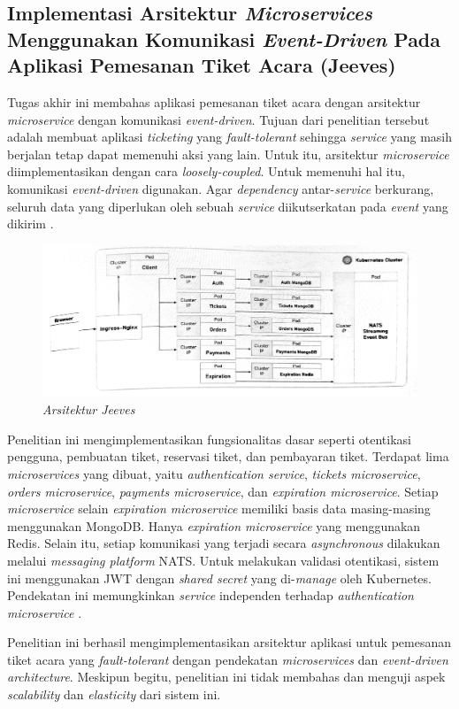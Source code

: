 \subsection{Implementasi Arsitektur \textit{Microservices} Menggunakan Komunikasi \textit{Event-Driven} Pada Aplikasi Pemesanan Tiket Acara (Jeeves)}

Tugas akhir ini membahas aplikasi pemesanan tiket acara dengan arsitektur \textit{microservice} dengan komunikasi \textit{event-driven}. Tujuan dari penelitian tersebut adalah membuat aplikasi \textit{ticketing} yang \textit{fault-tolerant} sehingga \textit{service} yang masih berjalan tetap dapat memenuhi aksi yang lain. Untuk itu, arsitektur \textit{microservice} diimplementasikan dengan cara \textit{loosely-coupled}. Untuk memenuhi hal itu, komunikasi \textit{event-driven} digunakan. Agar \textit{dependency} antar-\textit{service} berkurang, seluruh data yang diperlukan oleh sebuah \textit{service} diikutserkatan pada \textit{event} yang dikirim \parencite{microservicesEventDriven}.

\begin{figure}[ht]
    \centering
    \includegraphics[width=1\textwidth]{resources/chapter-2/jeeves.png}
    \caption{\textit{Arsitektur Jeeves \parencite{microservicesEventDriven}}}
    \label{fig:jeeves-architecture}
\end{figure}

Penelitian ini mengimplementasikan fungsionalitas dasar seperti otentikasi pengguna, pembuatan tiket, reservasi tiket, dan pembayaran tiket. Terdapat lima \textit{microservices} yang dibuat, yaitu \textit{authentication service}, \textit{tickets microservice}, \textit{orders microservice}, \textit{payments microservice}, dan \textit{expiration microservice}. Setiap \textit{microservice} selain \textit{expiration microservice} memiliki basis data masing-masing menggunakan MongoDB. Hanya \textit{expiration microservice} yang menggunakan Redis. Selain itu, setiap komunikasi yang terjadi secara \textit{asynchronous} dilakukan melalui \textit{messaging platform} NATS. Untuk melakukan validasi otentikasi, sistem ini menggunakan JWT dengan \textit{shared secret} yang di-\textit{manage} oleh Kubernetes. Pendekatan ini memungkinkan \textit{service} independen terhadap \textit{authentication microservice} \parencite{microservicesEventDriven}.

Penelitian ini berhasil mengimplementasikan arsitektur aplikasi untuk pemesanan tiket acara yang \textit{fault-tolerant} dengan pendekatan \textit{microservices} dan \textit{event-driven architecture}. Meskipun begitu, penelitian ini tidak membahas dan menguji aspek \textit{scalability} dan \textit{elasticity} dari sistem ini.